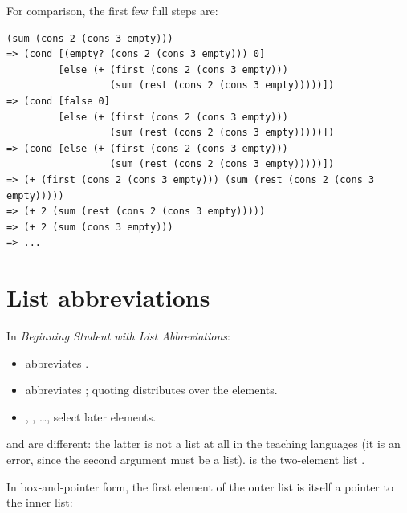 For comparison, the first few full steps are:
\begin{lstlisting}[style=racket]
(sum (cons 2 (cons 3 empty)))
=> (cond [(empty? (cons 2 (cons 3 empty))) 0]
         [else (+ (first (cons 2 (cons 3 empty)))
                  (sum (rest (cons 2 (cons 3 empty)))))])
=> (cond [false 0]
         [else (+ (first (cons 2 (cons 3 empty)))
                  (sum (rest (cons 2 (cons 3 empty)))))])
=> (cond [else (+ (first (cons 2 (cons 3 empty)))
                  (sum (rest (cons 2 (cons 3 empty)))))])
=> (+ (first (cons 2 (cons 3 empty))) (sum (rest (cons 2 (cons 3 empty)))))
=> (+ 2 (sum (rest (cons 2 (cons 3 empty)))))
=> (+ 2 (sum (cons 3 empty)))
=> ...
\end{lstlisting}

\section{List abbreviations}
In \emph{Beginning Student with List Abbreviations}:
\begin{itemize}
  \item {} abbreviates .
  \item {} abbreviates ; quoting distributes over the elements.
  \item {}, , \ldots,  select later elements.
\end{itemize}
 and  are different: the latter is not a list
at all in the teaching languages (it is an error, since the second argument
must be a list).  is the two-element list
.

In box-and-pointer form, the first element of the outer list is itself a
pointer to the inner list:

\begin{center}
\end{center}

